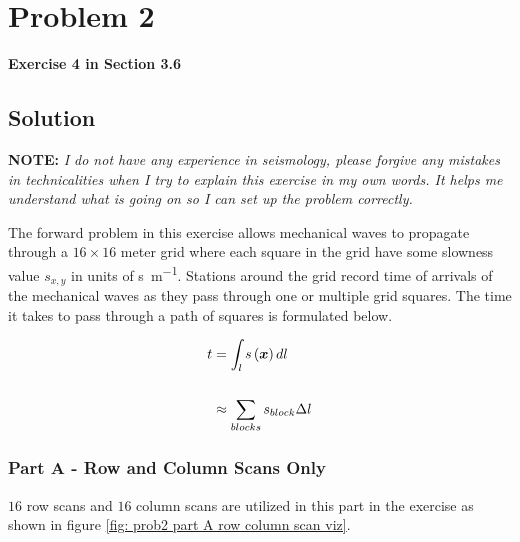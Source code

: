 
\begingroup
\allowdisplaybreaks

\newpage
\section{Problem 2}

\textbf{Exercise 4 in Section 3.6}

\subsection{Solution}

\textbf{NOTE: } \textit{I do not have any experience in seismology, please forgive any mistakes in technicalities when I try to explain this exercise in my own words. It helps me understand what is going on so I can set up the problem correctly.}
\newline

The forward problem in this exercise allows mechanical waves to propagate through a $16 \times 16$ meter grid where each square in the grid have some slowness value $s_{x,y}$ in units of \unit{\second\per\meter}. Stations around the grid record time of arrivals of the mechanical waves as they pass through one or multiple grid squares. The time it takes to pass through a path of squares is formulated below.

\begin{align*}
	t &= \int_l s\left(\boldsymbol{x}\right) dl \\
	\\
	&\approx \sum_{blocks} s_{block} \Delta l
\end{align*}


\subsubsection{Part A - Row and Column Scans Only}

$16$ row scans and $16$ column scans are utilized in this part in the exercise as shown in figure \ref{fig: prob2 part A row column scan viz}. 


